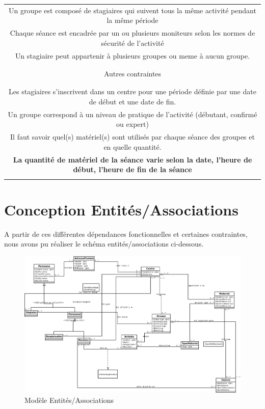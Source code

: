 \documentclass[10pt]{article}
\begin{document}
\begin{small}
\begin{tabular}{|c|}
Un groupe est composé de stagiaires qui suivent tous la même activité pendant la même période\\

Chaque séance est encadrée par un ou plusieurs moniteurs selon les normes de sécurité de l'activité\\

Un stagiaire peut appartenir à plusieurs groupes ou meme à aucun groupe.\\ \\

\hline
\\Autres contraintes\\ \\
\hline

\\Les stagiaires s’inscrivent dans un centre pour une période définie par une date de début et une date de fin.\\

Un groupe correspond à un niveau de pratique de l’activité (débutant, confirmé ou expert)\\

Il faut savoir quel(s) matériel(s) sont utilisés par chaque séance des groupes et en quelle quantité.\\

\textbf{La quantité de matériel de la séance varie selon la date, l'heure de début, l'heure de fin de la séance}\\ \\

\hline

\end{tabular}
\end{small}

\section{Conception Entités/Associations}

A partir de ces différentes dépendances fonctionnelles et certaines contraintes, nous avons pu réaliser le schéma entités/associations
ci-dessous.

\begin{figure}[h!]
\includegraphics[scale=0.3]{DiaVLV.png}
\caption{Modèle Entités/Associations}
\end{figure}
\end{document}
